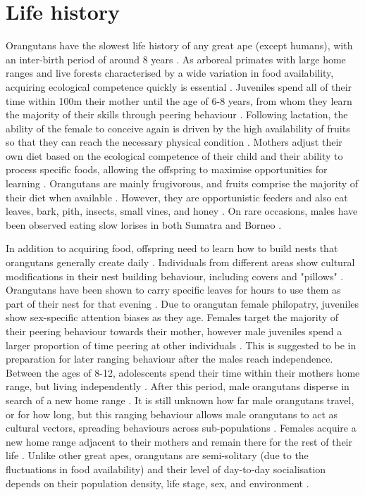 \section{Life history}  %

\label{section1.3}

Orangutans have the slowest life history of any great ape (except humans), with an inter-birth period of around 8 years \citep{Wich.2008t6}.  As arboreal primates with large home ranges and live forests characterised by a wide variation in food availability, acquiring ecological competence quickly is essential \citep{Noordwijk.2018}. Juveniles spend all of their time within 100m their mother until the age of 6-8 years, from whom they learn the majority of their skills through peering behaviour \citep{Wich.2008t6}. Following lactation, the ability of the female to conceive again is driven by the high availability of fruits so that they can reach the necessary physical condition \citep{Spillmann.2016}. Mothers adjust their own diet based on the ecological competence of their child and their ability to process specific foods, allowing the offspring to maximise opportunities for learning \citep{Mikeliban.2021}. Orangutans are mainly frugivorous, and fruits comprise the majority of their diet when available \citep{Galdikas.1988}. However, they are opportunistic feeders and also eat leaves, bark, pith, insects, small vines, and honey \citep{Galdikas.1988}. On rare occasions, males have been observed eating slow lorises in both Sumatra and Borneo \citep{Hardus.2012, Makur.2022}.

In addition to acquiring food, offspring need to learn how to build nests that orangutans generally create daily \citep{Prasetyo.2008}. Individuals from different areas show cultural modifications in their nest building behaviour, including covers and "pillows" \citep{Russon.2007}. Orangutans have been shown to carry specific leaves for hours to use them as part of their nest for that evening \citep{Russon.2007}. Due to orangutan female philopatry, juveniles show sex-specific attention biases as they age. Females target the majority of their peering behaviour towards their mother, however male juveniles spend a larger proportion of time peering at other individuals \citep{Ehmann.20216zj}. This is suggested to be in preparation for later ranging behaviour after the males reach independence.  Between the ages of 8-12, adolescents spend their time within their mothers home range, but living independently \citep{Wich.2008v8i0d}. After this period, male orangutans disperse in search of a new home range \citep{Morrogh-Bernard.2011zwh}. It is still unknown how far male orangutans travel, or for how long, but this ranging behaviour allows male orangutans to act as cultural vectors, spreading behaviours across sub-populations \citep{Mörchen.202378o}. Females acquire a new home range adjacent to their mothers and remain there for the rest of their life \citep{Wich.2008v8i0d}.  Unlike other great apes, orangutans are semi-solitary (due to the fluctuations in food availability) and their level of day-to-day socialisation depends on their population density, life stage, sex, and environment \citep{Wich.2008t6}. 

